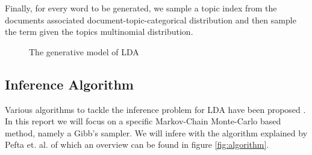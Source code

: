 \documentclass[12 pt,twopage]{article}
\begin{document}
Finally, for every word to be generated, we sample a topic index from the documents associated document-topic-categorical distribution and then sample the term given the topics multinomial distribution.
\onecolumn
\begin{figure}
 \begin{center}
  \begin{algorithm}[H]
   
  \end{algorithm}
  \caption{The generative model of LDA  \cite{Blei2003,Heinrich2005}}\label{fig:generativeProcess}
 \end{center}
\end{figure}
\subsection{Inference Algorithm}\label{sec:inference}
Various algorithms to tackle the inference problem for LDA have been proposed \cite{Blei2003}. In this report we will focus on a specific Markov-Chain Monte-Carlo based method, namely a Gibb's sampler. We will infere with the algorithm explained by Pefta et. al. of which an overview can be found in figure \ref{fig:algorithm}.
\end{document}
